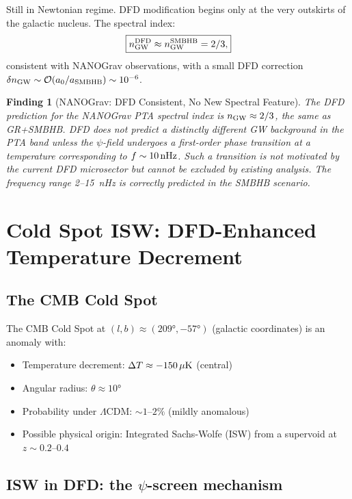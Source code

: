 \documentclass[11pt]{article}
\newtheorem{finding}{Finding}
\newcommand{\azero}{a_0}
\newcommand{\DFD}{{\rm DFD}}
\begin{document}
Still in Newtonian regime.  DFD modification begins only at the very
outskirts of the galactic nucleus.  The spectral index:
\begin{equation}
  \boxed{n_{\rm GW}^\DFD \approx n_{\rm GW}^{\rm SMBHB} = 2/3,}
\end{equation}
consistent with NANOGrav observations, with a small DFD correction
$\delta n_{\rm GW} \sim \mathcal{O}(\azero/a_{\rm SMBHB}) \sim 10^{-6}$.

\begin{finding}[NANOGrav: DFD Consistent, No New Spectral Feature]
The DFD prediction for the NANOGrav PTA spectral index is $n_{\rm GW} \approx 2/3$,
the same as GR+SMBHB.  DFD does not predict a distinctly different GW
background in the PTA band unless the $\psi$-field undergoes a first-order
phase transition at a temperature corresponding to $f \sim 10\,{\rm nHz}$.
Such a transition is not motivated by the current DFD microsector but
cannot be excluded by existing analysis.  The frequency range 2--15~nHz
is correctly predicted in the SMBHB scenario.
\end{finding}

\section{Cold Spot ISW: DFD-Enhanced Temperature Decrement}
\label{sec:cold-spot}

\subsection{The CMB Cold Spot}

The CMB Cold Spot at $(l,b) \approx (209°,-57°)$ (galactic coordinates)
is an anomaly with:
\begin{itemize}[nosep]
  \item Temperature decrement: $\Delta T \approx -150\,\mu{\rm K}$ (central)
  \item Angular radius: $\theta \approx 10°$
  \item Probability under $\Lambda$CDM: $\sim 1$--$2\%$ (mildly anomalous)
  \item Possible physical origin: Integrated Sachs-Wolfe (ISW) from a
    supervoid at $z \sim 0.2$--$0.4$
\end{itemize}

\subsection{ISW in DFD: the $\psi$-screen mechanism}
\end{document}
